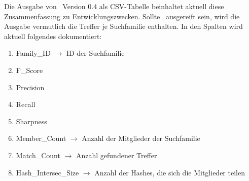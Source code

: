 \begin{enumerate}[a)]
                Die Ausgabe von \protfin\ Version 0.4 als \ac{CSV}-Tabelle beinhaltet aktuell diese Zusammenfassung zu Entwicklungszwecken. Sollte \protfin\ ausgereift sein, wird die Ausgabe vermutlich die Treffer je Suchfamilie enthalten. In den Spalten wird aktuell folgendes dokumentiert:
                \begin{enumerate}[1.]
                    \item Family\_ID $\rightarrow$ ID der Suchfamilie
                    \item F\_Score
                    \item Precision
                    \item Recall
                    \item Sharpness 
                    \item Member\_Count $\rightarrow$ Anzahl der Mitglieder der Suchfamilie
                    \item Match\_Count $\rightarrow$ Anzahl gefundener Treffer
                    \item Hash\_Intersec\_Size $\rightarrow$ Anzahl der Hashes, die sich die Mitglieder teilen
                \end{enumerate}
        \end{enumerate}

